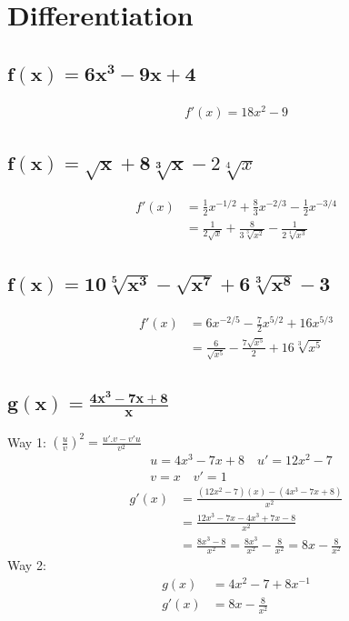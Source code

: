 \documentclass{article}
\begin{document}
\section{Differentiation}
\begin{multicols}{2}

\subsection{$\mathbf{f(x)=6x^3-9x+4}$}
\begin{align*}
    f'(x)=18x^2-9
\end{align*}

\subsection{$\mathbf{f(x)=\sqrt{x} + 8\sqrt[3]{x}} - 2\sqrt[4]{x}$}
\begin{align*}
    f'(x) &= \frac{1}{2}x^{-1/2} + \frac{8}{3}x^{-2/3} - \frac{1}{2}x^{-3/4} \\
        &= \frac{1}{2\sqrt{x}} + \frac{8}{3\sqrt[3]{x^2}} - \frac{1}{2\sqrt[4]{x^3}}
\end{align*}

\subsection{$\mathbf{f(x)= 10\sqrt[5]{x^3} - \sqrt{x^7} + 6\sqrt[3]{x^8} - 3}$}
\begin{align*}
    f'(x) &= 6x^{-2/5} - \frac{7}{2}x^{5/2} + 16x^{5/3} \\
        &= \frac{6}{\sqrt{x^5}} - \frac{7\sqrt{x^5}}{2} + 16\sqrt[3]{x^5}
\end{align*}

\subsection{$\mathbf{g(x)=\frac{4x^3-7x+8}{x}}$}
Way 1: $(\frac{u}{v})^2 = \frac{u'.v - v'u}{v^2}$
\begin{align*}
    &u = 4x^3 - 7x + 8 \quad u' = 12x^2-7 \\
    &v = x            \quad v' = 1
\end{align*}
\begin{align*}
    g'(x) &= \frac{(12x^2-7)(x)-(4x^3-7x+8)}{x^2} \\
        &= \frac{12x^3 - 7x - 4x^3 + 7x - 8}{x^2} \\
        &= \frac{8x^3 - 8}{x^2} = \frac{8x^3}{x^2} - \frac{8}{x^2} = 8x - \frac{8}{x^2}
\end{align*}
Way 2:
\begin{align*}
    g(x) &= 4x^2 - 7 + 8x^{-1} \\
    g'(x) &= 8x - \frac{8}{x^2}
\end{align*}


\end{multicols}
\end{document}
